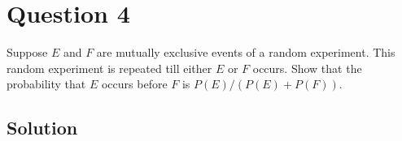 \section*{Question 4}

Suppose \(E\) and \(F\) are mutually exclusive events of a random experiment.
This random experiment is repeated till either \(E\) or \(F\) occurs.
Show that the probability that \(E\) occurs before \(F\) is \( P(E) / (P(E) + P(F)) \).

\subsection*{Solution}
